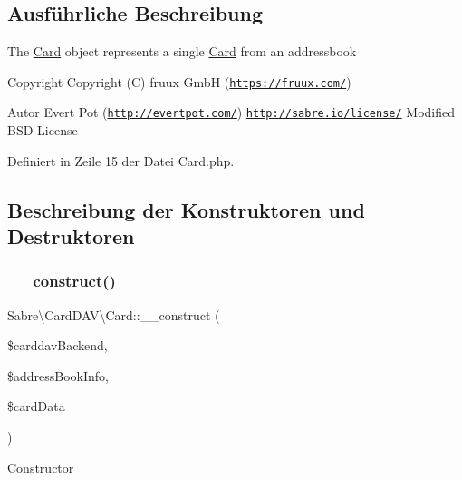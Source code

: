 \subsection{Ausführliche Beschreibung}
The \mbox{\hyperlink{class_sabre_1_1_card_d_a_v_1_1_card}{Card}} object represents a single \mbox{\hyperlink{class_sabre_1_1_card_d_a_v_1_1_card}{Card}} from an addressbook

\begin{DoxyCopyright}{Copyright}
Copyright (C) fruux GmbH (\href{https://fruux.com/}{\tt https\+://fruux.\+com/}) 
\end{DoxyCopyright}
\begin{DoxyAuthor}{Autor}
Evert Pot (\href{http://evertpot.com/}{\tt http\+://evertpot.\+com/})  \href{http://sabre.io/license/}{\tt http\+://sabre.\+io/license/} Modified B\+SD License 
\end{DoxyAuthor}


Definiert in Zeile 15 der Datei Card.\+php.



\subsection{Beschreibung der Konstruktoren und Destruktoren}
\mbox{\label{class_sabre_1_1_card_d_a_v_1_1_card_af0df15beeabd07f7b22764b750c1fce4}} 
\subsubsection{\texorpdfstring{\+\_\+\+\_\+construct()}{\_\_construct()}}
{\footnotesize\ttfamily Sabre\textbackslash{}\+Card\+D\+A\+V\textbackslash{}\+Card\+::\+\_\+\+\_\+construct (\begin{DoxyParamCaption}\item[{\mbox{\hyperlink{interface_sabre_1_1_card_d_a_v_1_1_backend_1_1_backend_interface}{Backend\textbackslash{}\+Backend\+Interface}}}]{\$carddav\+Backend,  }\item[{array}]{\$address\+Book\+Info,  }\item[{array}]{\$card\+Data }\end{DoxyParamCaption})}

Constructor



